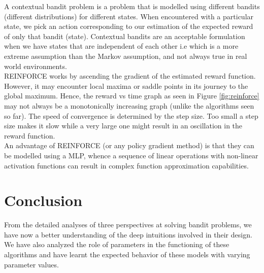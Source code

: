 \documentclass[12pt]{extarticle}
\begin{document}
A contextual bandit problem is a problem that is modelled using different bandits (different distributions) for different states. When encountered with a particular state, we pick an action corresponding to our estimation of the expected reward of only that bandit (state). Contextual bandits are an acceptable formulation when we have states that are independent of each other i.e which is a more extreme assumption than the Markov assumption, and not always true in real world environments.\\
REINFORCE works by ascending the gradient of the estimated reward function. However, it may encounter local maxima or saddle points in its journey to the global maximum. Hence, the reward vs time graph as seen in Figure \ref{fig:reinforce} may not always be a monotonically increasing graph (unlike the algorithms seen so far).
The speed of convergence is determined by the step size. Too small a step size makes it slow while a very large one might result in an oscillation in the reward function.\\
An advantage of REINFORCE (or any policy gradient method) is that they can be modelled using a MLP, whence a sequence of linear operations with non-linear activation functions can result in complex function approximation capabilities.\\

\section{Conclusion}
From the detailed analyses of three perspectives at solving bandit problems, we have now a better understanding of the deep intuitions involved in their design. We have also analyzed the role of parameters in the functioning of these algorithms and have learnt the expected behavior of these models with varying parameter values.\\



\end{document}
